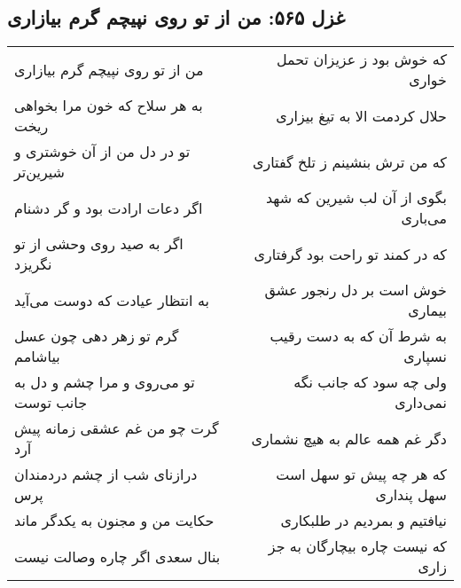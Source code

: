 \begin{center}
\section*{غزل ۵۶۵: من از تو روی نپیچم گرم بیازاری}
\label{sec:565}
\begin{longtable}{l p{0.5cm} r}
من از تو روی نپیچم گرم بیازاری
&&
که خوش بود ز عزیزان تحمل خواری
\\
به هر سلاح که خون مرا بخواهی ریخت
&&
حلال کردمت الا به تیغ بیزاری
\\
تو در دل من از آن خوشتری و شیرین‌تر
&&
که من ترش بنشینم ز تلخ گفتاری
\\
اگر دعات ارادت بود و گر دشنام
&&
بگوی از آن لب شیرین که شهد می‌باری
\\
اگر به صید روی وحشی از تو نگریزد
&&
که در کمند تو راحت بود گرفتاری
\\
به انتظار عیادت که دوست می‌آید
&&
خوش است بر دل رنجور عشق بیماری
\\
گرم تو زهر دهی چون عسل بیاشامم
&&
به شرط آن که به دست رقیب نسپاری
\\
تو می‌روی و مرا چشم و دل به جانب توست
&&
ولی چه سود که جانب نگه نمی‌داری
\\
گرت چو من غم عشقی زمانه پیش آرد
&&
دگر غم همه عالم به هیچ نشماری
\\
درازنای شب از چشم دردمندان پرس
&&
که هر چه پیش تو سهل است سهل پنداری
\\
حکایت من و مجنون به یکدگر ماند
&&
نیافتیم و بمردیم در طلبکاری
\\
بنال سعدی اگر چاره وصالت نیست
&&
که نیست چاره بیچارگان به جز زاری
\\
\end{longtable}
\end{center}
